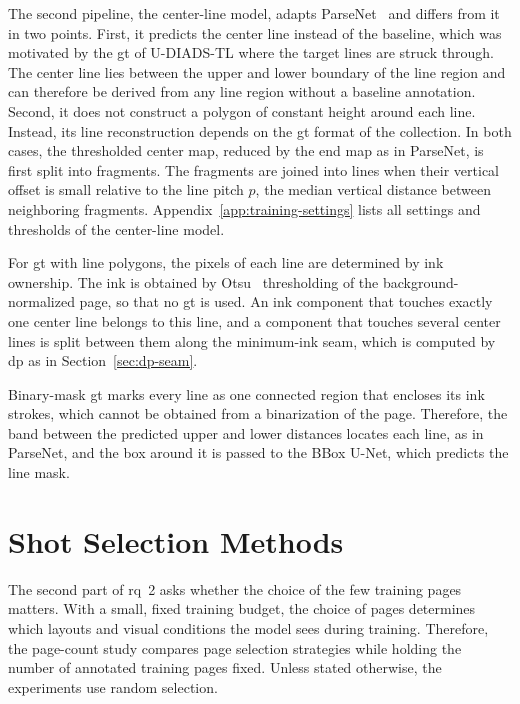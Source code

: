 The second pipeline, the center-line model, adapts ParseNet~\cite{kodym2021page} and differs from it in two points. First, it predicts the center line instead of the baseline, which was motivated by the \gls{gt} of U-DIADS-TL where the target lines are struck through. The center line lies between the upper and lower boundary of the line region and can therefore be derived from any line region without a baseline annotation. Second, it does not construct a polygon of constant height around each line. Instead, its line reconstruction depends on the \gls{gt} format of the collection. \label{sec:center-line-decoding}In both cases, the thresholded center map, reduced by the end map as in ParseNet, is first split into fragments. The fragments are joined into lines when their vertical offset is small relative to the line pitch \(p\), the median vertical distance between neighboring fragments. Appendix~\ref{app:training-settings} lists all settings and thresholds of the center-line model.

For \gls{gt} with line polygons, the pixels of each line are determined by ink ownership. The ink is obtained by Otsu~\cite{otsu1979threshold} thresholding of the background-normalized page, so that no \gls{gt} is used. An ink component that touches exactly one center line belongs to this line, and a component that touches several center lines is split between them along the minimum-ink seam, which is computed by \gls{dp} as in Section~\ref{sec:dp-seam}.

Binary-mask \gls{gt} marks every line as one connected region that encloses its ink strokes, which cannot be obtained from a binarization of the page. Therefore, the band between the predicted upper and lower distances locates each line, as in ParseNet, and the box around it is passed to the BBox U-Net, which predicts the line mask.

\FloatBarrier
\section{Shot Selection Methods}
\label{sec:shot-sampling}

The second part of \gls{rq}~2 asks whether the choice of the few training pages matters. With a small, fixed training budget, the choice of pages determines which layouts and visual conditions the model sees during training. Therefore, the page-count study compares page selection strategies while holding the number of annotated training pages fixed. Unless stated otherwise, the experiments use random selection.

